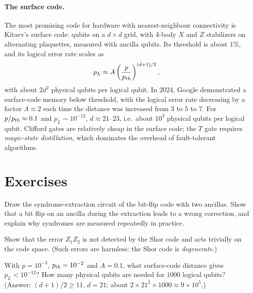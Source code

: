 \paragraph{The surface code.} The most promising code for hardware with nearest-neighbour connectivity is Kitaev's surface code: qubits on a $d\times d$ grid, with 4-body $X$ and $Z$ stabilizers on alternating plaquettes,
measured with ancilla qubits. Its threshold is about $1\%$, and its logical error rate scales as
\begin{equation}
  p_L\approx A\left(\frac p{p_{\rm th}}\right)^{(d+1)/2},
\end{equation}
with about $2d^2$ physical qubits per logical qubit. In 2024, Google demonstrated a surface-code memory below threshold, with the logical error rate decreasing by a factor $\Lambda\approx2$ each time the distance was
increased from $3$ to $5$ to $7$. For $p/p_{\rm th}\approx0.1$ and $p_L\sim10^{-12}$, $d\approx21$--$23$, i.e.\ about $10^3$ physical qubits per logical qubit. Clifford gates are relatively cheap in the surface code; the $T$ gate
requires \emph{magic-state distillation}, which dominates the overhead of fault-tolerant algorithms.

\section{Exercises}
\begin{exercise}
Draw the syndrome-extraction circuit of the bit-flip code with two ancillas. Show that a bit flip on an ancilla during the extraction leads to a wrong correction, and explain why syndromes are measured repeatedly in practice.
\end{exercise}
\begin{exercise}
Show that the error $Z_1Z_2$ is not detected by the Shor code and acts trivially on the code space. (Such errors are harmless: the Shor code is \emph{degenerate}.)
\end{exercise}
\begin{exercise}
With $p=10^{-3}$, $p_{\rm th}=10^{-2}$ and $A=0.1$, what surface-code distance gives $p_L<10^{-12}$? How many physical qubits are needed for $1000$ logical qubits?
(Answer: $(d+1)/2\ge11$, $d=21$; about $2\times21^2\times1000\approx9\times10^5$.)
\end{exercise}
